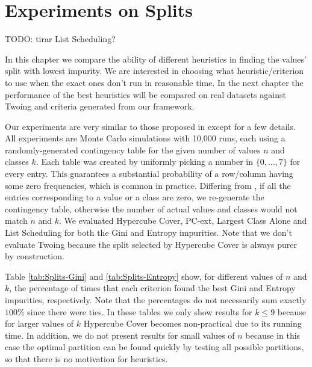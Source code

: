 \newpage

\chapter{Experiments on Splits}
\label{chap:experiments-splits}

TODO: tirar List Scheduling?

In this chapter we compare the ability of different heuristics in finding the values' split with lowest impurity. We are interested in choosing what heuristic/criterion to use when the exact ones don't run in reasonable time. In the next chapter the performance of the best heuristics will be compared on real datasets against Twoing and criteria generated from our framework.

Our experiments are very similar to those proposed in \cite{journals/datamine/CoppersmithHH99} except for a few details. All experiments are Monte Carlo simulations with 10,000 runs, each using a randomly-generated contingency table for the given number of values $n$ and classes $k$. Each table  was created by uniformly picking a number in $\{0, \ldots, 7\}$ for every entry. This guarantees a substantial probability of a row/column having some zero frequencies, which is common in practice. Differing from  \cite{journals/datamine/CoppersmithHH99}, if all the entries corresponding to a value or a class are zero, we re-generate the contingency table, otherwise the number of actual values and classes would not match $n$ and $k$. We evaluated Hypercube Cover, PC-ext,
Largest Class Alone and List Scheduling for both the Gini and Entropy impurities. Note that we don't evaluate Twoing because the split selected by Hypercube Cover is always purer by construction.

Table \ref{tab:Splits-Gini} and \ref{tab:Splits-Entropy} show, for different values of $n$ and $k$, the percentage of times that
each criterion found the best Gini and Entropy impurities, respectively. Note that the percentages do not necessarily sum exactly $100\%$ since
there were ties. In these tables we only show results for $k \leq 9$ because for larger values
of $k$ Hypercube Cover becomes non-practical due to its running time. In addition, we do not present results for small values of $n$ because in this
case the optimal  partition can be found quickly by testing all possible partitions, so that there is no motivation for heuristics.

